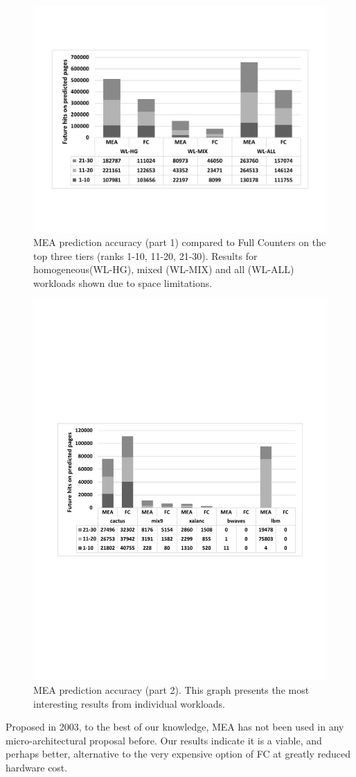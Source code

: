 \begin{figure}[t]
\centering
  \includegraphics[scale=.3]{figures/mea_2_v2.pdf}
  \caption{MEA prediction accuracy (part 1) compared to Full Counters on the top three tiers (ranks 1-10, 11-20, 21-30). Results for homogeneous(WL-HG), mixed (WL-MIX) and all (WL-ALL) workloads shown due to space limitations.}
  \label{fig:mea_2}
\end{figure}

\begin{figure}[t]
\centering
  \includegraphics[scale=.45]{figures/mea_3_v2.pdf}
  \caption{MEA prediction accuracy (part 2). This graph presents the most interesting results from individual workloads.}
  \label{fig:mea_3}
\end{figure}

Proposed in 2003, to the best of our knowledge, MEA has not been used in any micro-architectural proposal before. Our results indicate it is a viable, and perhaps better, alternative to the very expensive option of FC at greatly reduced hardware cost.
